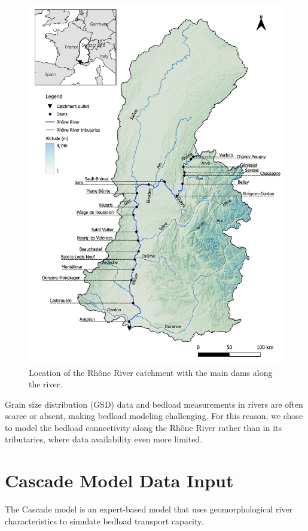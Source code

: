 \documentclass[
]{book}
\begin{document}
\begin{figure}
\includegraphics[width=34.44in]{img/local_mapa} \caption{Location of the Rhône River catchment with the main dams along the river.}\label{fig:local}
\end{figure}

Grain size distribution (GSD) data and bedload measurements in rivers are often scarce or absent, making bedload modeling challenging. For this reason, we chose to model the bedload connectivity along the Rhône River rather than in its tributaries, where data availability even more limited.

\section{Cascade Model Data Input}\label{cascade-model-data-input}

The Cascade model is an expert-based model that uses geomorphological river characteristics to simulate bedload transport capacity.
\end{document}
